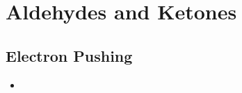 \documentclass[../notes.tex]{subfiles}
\begin{document}
\chapter{Aldehydes and Ketones}
\section{Electron Pushing}
\begin{itemize}
    \item {}
\end{itemize}
\end{document}
